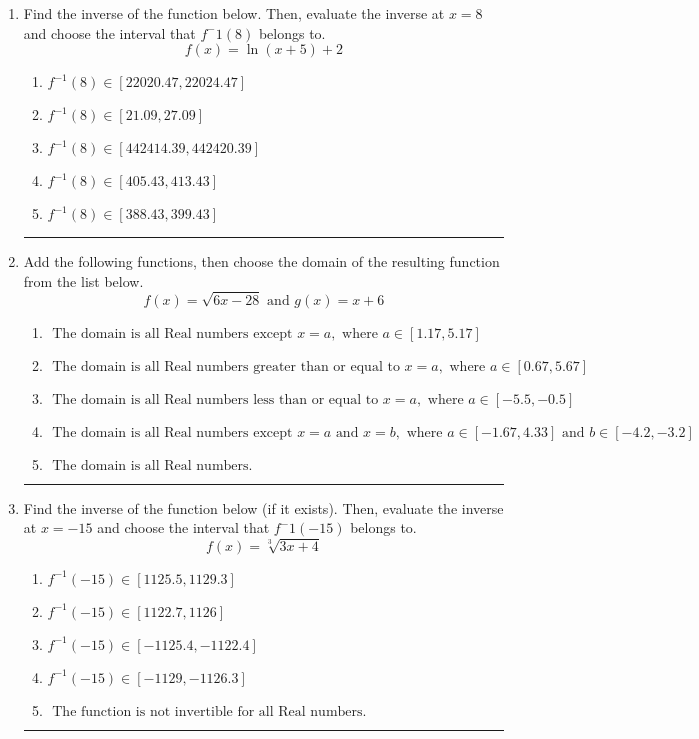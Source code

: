 \documentclass[14pt]{extbook}
\newcommand{\litem}[1]{\item#1\hspace*{-1cm}\rule{\textwidth}{0.4pt}}
\begin{document}
\begin{enumerate}
\litem{
Find the inverse of the function below. Then, evaluate the inverse at $x = 8$ and choose the interval that $f^-1(8)$ belongs to.\[ f(x) = \ln{(x+5)}+2 \]\begin{enumerate}[label=\Alph*.]
\item \( f^{-1}(8) \in [22020.47, 22024.47] \)
\item \( f^{-1}(8) \in [21.09, 27.09] \)
\item \( f^{-1}(8) \in [442414.39, 442420.39] \)
\item \( f^{-1}(8) \in [405.43, 413.43] \)
\item \( f^{-1}(8) \in [388.43, 399.43] \)

\end{enumerate} }
\litem{
Add the following functions, then choose the domain of the resulting function from the list below.\[ f(x) = \sqrt{6x-28}  \text{ and } g(x) = x + 6 \]\begin{enumerate}[label=\Alph*.]
\item \( \text{ The domain is all Real numbers except } x = a, \text{ where } a \in [1.17, 5.17] \)
\item \( \text{ The domain is all Real numbers greater than or equal to } x = a, \text{ where } a \in [0.67, 5.67] \)
\item \( \text{ The domain is all Real numbers less than or equal to } x = a, \text{ where } a \in [-5.5, -0.5] \)
\item \( \text{ The domain is all Real numbers except } x = a \text{ and } x = b, \text{ where } a \in [-1.67, 4.33] \text{ and } b \in [-4.2, -3.2] \)
\item \( \text{ The domain is all Real numbers. } \)

\end{enumerate} }
\litem{
Find the inverse of the function below (if it exists). Then, evaluate the inverse at $x = -15$ and choose the interval that $f^-1(-15)$ belongs to.\[ f(x) = \sqrt[3]{3 x + 4} \]\begin{enumerate}[label=\Alph*.]
\item \( f^{-1}(-15) \in [1125.5, 1129.3] \)
\item \( f^{-1}(-15) \in [1122.7, 1126] \)
\item \( f^{-1}(-15) \in [-1125.4, -1122.4] \)
\item \( f^{-1}(-15) \in [-1129, -1126.3] \)
\item \( \text{ The function is not invertible for all Real numbers. } \)


\end{enumerate}}
\end{enumerate}
\end{document}

